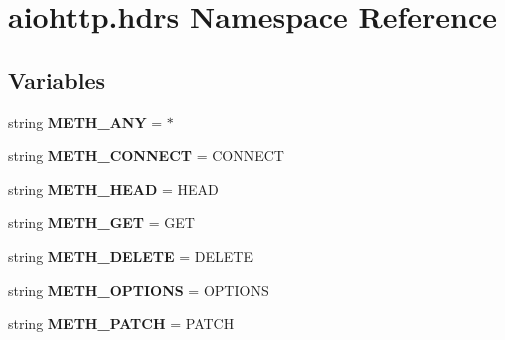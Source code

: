 \hypertarget{namespaceaiohttp_1_1hdrs}{}\section{aiohttp.\+hdrs Namespace Reference}
\label{namespaceaiohttp_1_1hdrs}
\subsection*{Variables}
\begin{DoxyCompactItemize}
\item 
\mbox{\label{namespaceaiohttp_1_1hdrs_ac4ec19c19704b0acc51d580532bf2cd6}} 
string {\bfseries M\+E\+T\+H\+\_\+\+A\+NY} = \textquotesingle{}$\ast$\textquotesingle{}
\item 
\mbox{\label{namespaceaiohttp_1_1hdrs_ad880b6a7972b0b15fb419257456293b5}} 
string {\bfseries M\+E\+T\+H\+\_\+\+C\+O\+N\+N\+E\+CT} = \textquotesingle{}C\+O\+N\+N\+E\+CT\textquotesingle{}
\item 
\mbox{\label{namespaceaiohttp_1_1hdrs_a46519253062342a7b3f83baf6b320389}} 
string {\bfseries M\+E\+T\+H\+\_\+\+H\+E\+AD} = \textquotesingle{}H\+E\+AD\textquotesingle{}
\item 
\mbox{\label{namespaceaiohttp_1_1hdrs_adaf0570a3207b31f18442ee8e3b6a208}} 
string {\bfseries M\+E\+T\+H\+\_\+\+G\+ET} = \textquotesingle{}G\+ET\textquotesingle{}
\item 
\mbox{\label{namespaceaiohttp_1_1hdrs_aeff0ca532f78bb1b8c7055c13db873d7}} 
string {\bfseries M\+E\+T\+H\+\_\+\+D\+E\+L\+E\+TE} = \textquotesingle{}D\+E\+L\+E\+TE\textquotesingle{}
\item 
\mbox{\label{namespaceaiohttp_1_1hdrs_a93dd2cf42cca443a8993f57535f0093b}} 
string {\bfseries M\+E\+T\+H\+\_\+\+O\+P\+T\+I\+O\+NS} = \textquotesingle{}O\+P\+T\+I\+O\+NS\textquotesingle{}
\item 
\mbox{\label{namespaceaiohttp_1_1hdrs_a4c3b347b410f9a9509a5518ba4c943a3}} 
string {\bfseries M\+E\+T\+H\+\_\+\+P\+A\+T\+CH} = \textquotesingle{}P\+A\+T\+CH\textquotesingle{}

\end{DoxyCompactItemize}
